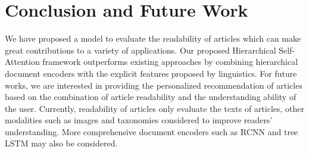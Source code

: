 \documentclass[runningheads]{llncs}
\begin{document}
\iffalse
\subsection{Word Representations}\label{sec:embed}


To show the effectiveness of the readability-aware Skip-Gram (R-S-G) for word representations in the readability analysis task, we compare against the approaches where other word representations are adopted, including the original Skip-Gram (S-G) model and directly represent each word using the readability score (1D) defined by Equation~\ref{eq:diff}.


The results in Table~\ref{tbl:word} show the effects from different word representation approaches on several neural models. We have selected HATT which is the best semantic model and HATT+ which is the second-best model as already shown in Table~\ref{tbl:cv} to compare with the proposed hierarchical self-attention model(ReadNet).
As shown from this table, the readability-aware Skip-Gram approach shows better accuracy than original Skip-Gram approach. The improvement is more noticeable for HATT because HATT does not contain word difficulty features while HATT+ and our proposed model already contain the feature \emph{number of syllables per word} to model the word difficulty.
\fi \section{Conclusion and Future Work}
We have proposed a model to evaluate the readability of articles which can make great contributions to a variety of applications. Our proposed Hierarchical Self-Attention framework outperforms existing approaches by combining hierarchical document encoders with the explicit features proposed by linguistics. For future works, we are interested in providing the personalized recommendation of articles based on the combination of article readability and the understanding ability of the user. Currently, readability of articles only evaluate the texts of articles, other modalities such as images \cite{pezeshkpour2018embedding} and taxonomies \cite{chen2018onto} considered to improve readers' understanding. More comprehensive document encoders such as RCNN \cite{chen2019pipr} and tree LSTM \cite{tai2015improved} may also be considered. 

 \newpage

\begingroup

\endgroup
 
\end{document}
